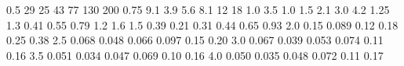 0.5  29  25  43  77  130  200 
0.75  9.1  3.9  5.6  8.1  12  18 
1.0  3.5  1.0  1.5  2.1  3.0  4.2 
1.25  1.3  0.41  0.55  0.79  1.2  1.6 
1.5  0.39  0.21  0.31  0.44  0.65  0.93 
2.0  0.15  0.089  0.12  0.18  0.25  0.38 
2.5  0.068  0.048  0.066  0.097  0.15  0.20 
3.0  0.067  0.039  0.053  0.074  0.11  0.16 
3.5  0.051  0.034  0.047  0.069  0.10  0.16 
4.0  0.050  0.035  0.048  0.072  0.11  0.17 

